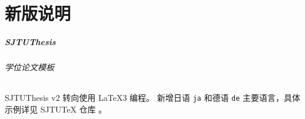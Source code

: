 
\part{新版说明}

\begin{frame}
  \frametitle{SJTUThesis}
  \framesubtitle{学位论文模板}
  SJTUThesis v2 转向使用 \LaTeX3 编程。
  新增日语 \texttt{ja} 和德语 \texttt{de} 主要语言，具体示例详见 SJTUTeX 仓库 。

  \begin{figure}
    \scriptsize
    \begin{columns}[c]
      \hfill
      \begin{column}{0.2\textwidth}

\end{column}
\end{columns}
\end{figure}
\end{frame}
